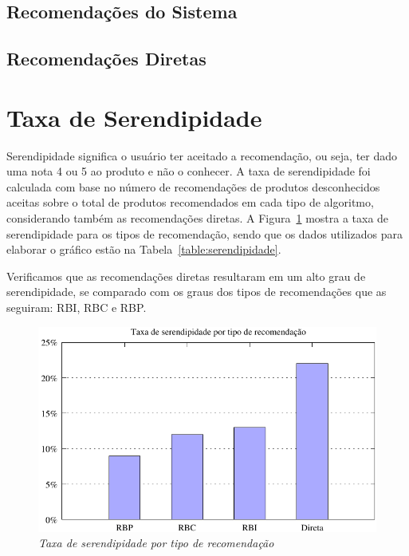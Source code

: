 \subsection{Recomendações do Sistema}

\subsection{Recomendações Diretas}


\section{Taxa de Serendipidade}
\label{sec:taxa_de_serendipidade}

Serendipidade significa o usuário ter aceitado a recomendação, ou seja, ter dado uma nota 4 ou 5 ao produto e não o conhecer. A taxa de serendipidade foi calculada com base no número de recomendações de produtos desconhecidos aceitas sobre o total de produtos recomendados em cada tipo de algoritmo, considerando também as recomendações diretas. A Figura~\ref{fig:serendipidade} mostra a taxa de serendipidade para os tipos de recomendação, sendo que os dados utilizados para elaborar o gráfico estão na Tabela~\ref{table:serendipidade}.

Verificamos que as recomendações diretas resultaram em um alto grau de serendipidade, se comparado com os graus dos tipos de recomendações que as seguiram: RBI, RBC e RBP.

\begin{figure}
    \centering
    \includegraphics[width=\textwidth]{imagens/grafico_serendipidade}
    \caption{\it Taxa de serendipidade por tipo de recomendação}
    \label{fig:serendipidade}
\end{figure}

